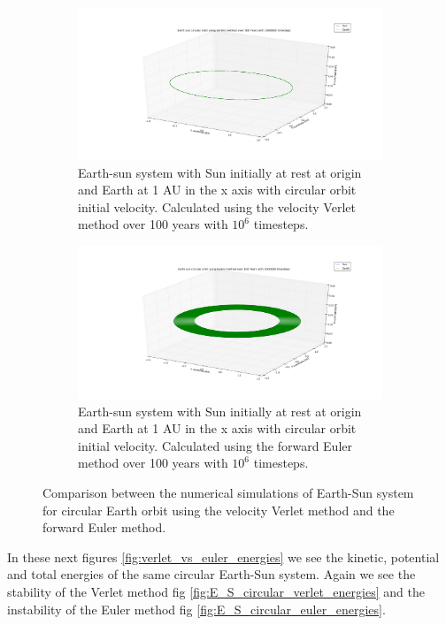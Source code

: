 \documentclass[a4paper,11pt]{article}
\begin{document}
{\begin{figure}[H]
	\centering
	\begin{subfigure}[b]{1\textwidth}
		\includegraphics[scale=0.3]{figure_4}
		\caption{Earth-sun system with Sun initially at rest at origin and Earth at 1 AU in the x axis with circular orbit initial velocity. Calculated using the velocity Verlet method over 100 years with $10^{6}$ timesteps.}
		\label{fig:E_S_circular_verlet}
	\end{subfigure}
	\begin{subfigure}[b]{1\textwidth}
		\includegraphics[scale=0.3]{figure_5}
		\caption{Earth-sun system with Sun initially at rest at origin and Earth at 1 AU in the x axis with circular orbit initial velocity. Calculated using the forward Euler method over 100 years with $10^{6}$ timesteps.}
		\label{fig:E_S_circular_euler}
	\end{subfigure}
	\caption{Comparison between the numerical simulations of Earth-Sun system for circular Earth orbit using the velocity Verlet method and the forward Euler method.}
	\label{fig:verlet_vs_euler}
\end{figure}

In these next figures \ref{fig:verlet_vs_euler_energies} we see the kinetic, potential and total energies of the same circular Earth-Sun system. Again we see the stability of the Verlet method fig \ref{fig:E_S_circular_verlet_energies} and the instability of the Euler method fig \ref{fig:E_S_circular_euler_energies}.

}
\end{document}
